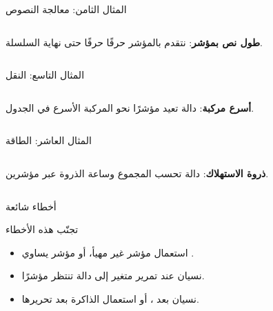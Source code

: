 \documentclass[aspectratio=169, 11pt, t, xcolor={table}]{beamer}
\begin{document}
\begin{frame}[t]{المثال الثامن: معالجة النصوص}
    \begin{columns}[T]
        {\small \textbf{طول نص بمؤشر}: نتقدم بالمؤشر حرفًا حرفًا حتى نهاية السلسلة.\par}
        \vspace{0.3cm}
    \end{columns}
\end{frame}

\begin{frame}[t]{المثال التاسع: النقل}
    \begin{columns}[T]
        {\small \textbf{أسرع مركبة}: دالة تعيد مؤشرًا نحو المركبة الأسرع في الجدول.\par}
        \vspace{0.3cm}
    \end{columns}
\end{frame}

\begin{frame}[t]{المثال العاشر: الطاقة}
    \begin{columns}[T]
        {\small \textbf{ذروة الاستهلاك}: دالة تحسب المجموع وساعة الذروة عبر مؤشرين.\par}
        \vspace{0.3cm}
    \end{columns}
\end{frame}

\begin{frame}{أخطاء شائعة}
    \begin{obox}{\faExclamationTriangle\quad تجنّب هذه الأخطاء}
        \begin{itemize}
            \item استعمال مؤشر غير مهيأ، أو مؤشر يساوي .
            \item نسيان \code{\&} عند تمرير متغير إلى دالة تنتظر مؤشرًا.
            \item نسيان  بعد ، أو استعمال الذاكرة بعد تحريرها.
        \end{itemize}
    \end{obox}
\end{frame}
\end{document}
